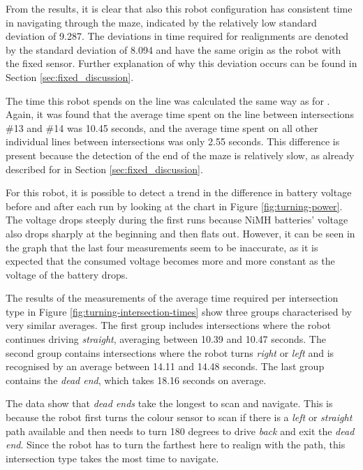 From the results, it is clear that also this robot configuration has consistent time in navigating through the maze, indicated by the relatively low standard deviation of 9.287. The deviations in time required for realignments are denoted by the standard deviation of 8.094 and have the same origin as the robot with the fixed sensor. Further explanation of why this deviation occurs can be found in Section \ref{sec:fixed_discussion}.

The time this robot spends on the line was calculated the same way as for \FixRob. Again, it was found that the average time spent on the line between intersections \#13 and \#14 was 10.45 seconds, and the average time spent on all other individual lines between intersections was only 2.55 seconds. This difference is present because the detection of the end of the maze is relatively slow, as already described for \FixRob in Section \ref{sec:fixed_discussion}.

For this robot, it is possible to detect a trend in the difference in battery voltage before and after each run by looking at the chart in Figure \ref{fig:turning-power}. The voltage drops steeply during the first runs because NiMH batteries' voltage also drops sharply at the beginning and then flats out. However, it can be seen in the graph that the last four measurements seem to be inaccurate, as it is expected that the consumed voltage becomes more and more constant as the voltage of the battery drops.

The results of the measurements of the average time required per intersection type in Figure \ref{fig:turning-intersection-times} show three groups characterised by very similar averages. The first group includes intersections where the robot continues driving \textit{straight}, averaging between 10.39 and 10.47 seconds. The second group contains intersections where the robot turns \textit{right} or \textit{left} and is recognised by an average between 14.11 and 14.48 seconds. The last group contains the \textit{dead end}, which takes 18.16 seconds on average.

The data show that \textit{dead ends} take the longest to scan and navigate. This is because the robot first turns the colour sensor to scan if there is a \textit{left} or \textit{straight} path available and then needs to turn 180 degrees to drive \textit{back} and exit the \textit{dead end}. Since the robot has to turn the farthest here to realign with the path, this intersection type takes the most time to navigate.

